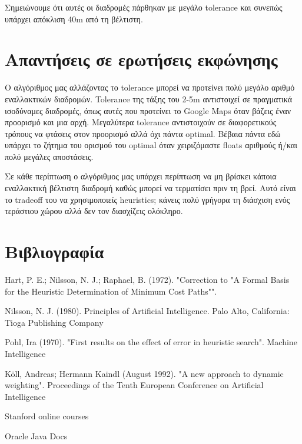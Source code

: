 \documentclass[a4paper,oneside, 11pt]{article}
\begin{document}
Σημειώνουμε ότι αυτές οι διαδρομές πάρθηκαν με μεγάλο tolerance και συνεπώς υπάρχει απόκλιση 40m από τη βέλτιστη.

\section{Απαντήσεις σε ερωτήσεις εκφώνησης}

Ο αλγόριθμος μας αλλάζοντας το tolerance μπορεί να προτείνει πολύ μεγάλο αριθμό εναλλακτικών διαδρομών. Tolerance της τάξης του 2-5m αντιστοιχεί σε πραγματικά ισοδύναμες διαδρομές, όπως αυτές που προτείνει το Google Maps όταν βάζεις έναν προορισμό και μια αρχή. Μεγαλύτερα tolerance αντιστοιχούν σε διαφορετικούς τρόπους να φτάσεις στον προορισμό αλλά όχι πάντα optimal. Βέβαια πάντα εδώ υπάρχει το ζήτημα του ορισμού του optimal όταν χειριζόμαστε floats αριθμούς ή/και πολύ μεγάλες αποστάσεις. \bigbreak 

Σε κάθε περίπτωση ο αλγόριθμος μας υπάρχει περίπτωση να μη βρίσκει κάποια εναλλακτική βέλτιστη διαδρομή καθώς μπορεί να τερματίσει πριν τη βρεί. Αυτό είναι το tradeoff του να χρησιμοποιείς heuristics; κάνεις πολύ γρήγορα τη διάσχιση ενός τεράστιου χώρου αλλά δεν τον διασχίζεις ολόκληρο.


\section{Βιβλιογραφία}
\noindent [1] Hart, P. E.; Nilsson, N. J.; Raphael, B. (1972). "Correction to "A Formal Basis for the Heuristic Determination of Minimum Cost Paths"". \par 
\noindent[2] Nilsson, N. J. (1980). Principles of Artificial Intelligence. Palo Alto, California: Tioga Publishing Company \par 
\noindent[3] Pohl, Ira (1970). "First results on the effect of error in heuristic search". Machine Intelligence \par 
\noindent[4] Köll, Andreas; Hermann Kaindl (August 1992). "A new approach to dynamic weighting". Proceedings of the Tenth European Conference on Artificial Intelligence \par 
\noindent [5] Stanford online courses \par 
\noindent [6] Oracle Java Docs \par 
\end{document}
